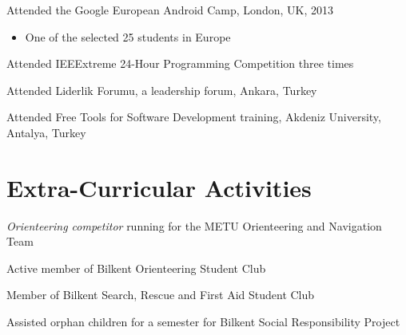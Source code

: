 \documentclass[margin]{res} %
\begin{document}
\begin{resume}
		Attended the Google European Android Camp, London, UK, 2013
		\begin{itemize} 
			\item[] One of the selected 25 students in Europe
		\end{itemize}

		Attended IEEExtreme 24-Hour Programming Competition three times

		Attended Liderlik Forumu, a leadership forum, Ankara, Turkey 

		Attended Free Tools for Software Development training, Akdeniz University, Antalya, Turkey


	\section{Extra-Curricular Activities} 	
		\resizebox{\textwidth}{!} { {\it Orienteering competitor} running for the METU Orienteering and Navigation Team}

		Active member of Bilkent Orienteering Student Club

		Member of Bilkent Search, Rescue and First Aid Student Club

		Assisted orphan children for a semester for Bilkent Social Responsibility Project

\end{resume}
\end{document}
